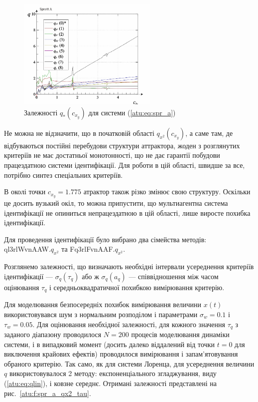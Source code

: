 \begin{figure}[htb!]
\centerline{
  \includegraphics[width=0.60\textwidth]{p/cha/spr_a/sprott_a_q-p_c_x_y.png}
}
\caption{Залежності $ q_{*} (c_{x_y}) $ для системи (\ref{atu:eq:spr_a})}
\label{atu:f:spr_a_q}
\end{figure}

Не можна не відзначити, що в початковій області
$ q_{x^2} (c_{x_y}) $, а саме там, де відбуваються постійні перебудови
структури аттрактора, жоден з розглянутих критеріїв не
має достатньої монотонності, що не дає гарантії побудови
працездатною системи ідентифікації. Для роботи в цій області,
швидше за все, потрібно синтез спеціальних критеріїв.

В околі точки $c_{x_y} = 1.775$ атрактор також різко змінює свою
структуру. Оскільки це досить вузький окіл, то можна припустити, що
мультиагентна система ідентифікації не опиниться непрацездатною в цій області,
лише виросте похибка ідентифікації.

Для проведення ідентифікації було вибрано два сімейства
методів:
ql3rlWvnAAW.$q_{x^2}$ та
Fq3rlFvnAAF.$q_{x^2}$.

Розглянемо залежності, що визначають необхідні інтервали
усереднення критеріїв ідентифікації
--- $ \sigma_q(\tau_q) $
або ж
$ \sigma_q (a_q) $ --- співвідношення між часом оцінювання
$ \tau_q $ і середньоквадратичної похибкою вимірювання критерію.

Для моделювання безпосередніх похибок вимірювання величини
$ x (t) $ використовувався шум з нормальним розподілом і
параметрами
$ \sigma_w = 0.1 $ і
$ \tau_w = 0.05 $. Для оцінювання необхідної залежності, для кожного
значення
$ \tau_q $ з заданого діапазону проводилося
$ N = 200 $ процесів моделювання динаміки системи, і в випадковий
момент (досить далеко віддалений від точки
$ t = 0 $ для виключення крайових ефектів) проводилося вимірювання
і запам'ятовування обраного критерію. Так само, як для системи
Лоренца, для усереднення величини
$ q $ використовувалося 2 методу: експоненціального згладжування,
виду (\ref{atu:eq:qlin}), і ковзне середнє. Отримані залежності
представлені на рис.~\ref{atu:f:spr_a_qx2_tau}.



